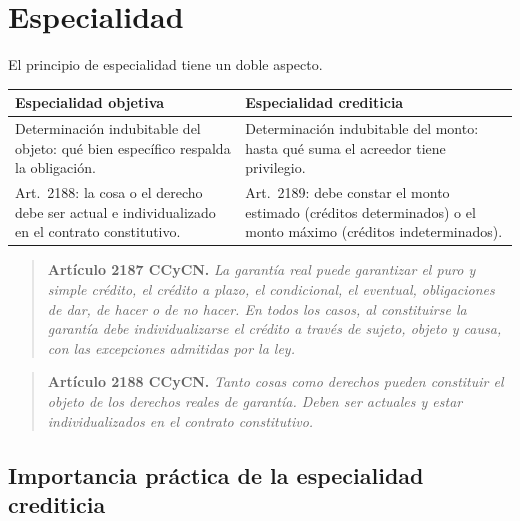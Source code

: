 \documentclass[12pt,oneside]{book}
\begin{document}
\section{Especialidad}

El principio de especialidad tiene un doble aspecto.

\begin{table}[H]
\centering
\begin{tabularx}{\textwidth}{@{}LL@{}}
\toprule
\textbf{Especialidad objetiva} & \textbf{Especialidad crediticia} \\
\midrule
Determinación indubitable del objeto: qué bien específico respalda la obligación. & Determinación indubitable del monto: hasta qué suma el acreedor tiene privilegio. \\
\addlinespace
Art.~2188: la cosa o el derecho debe ser actual e individualizado en el contrato constitutivo. & Art.~2189: debe constar el monto estimado (créditos determinados) o el monto máximo (créditos indeterminados). \\
\bottomrule
\end{tabularx}
\end{table}

\begin{quote}
\textbf{Artículo 2187 CCyCN.} \textit{La garantía real puede garantizar el puro y simple crédito, el crédito a plazo, el condicional, el eventual, obligaciones de dar, de hacer o de no hacer. En todos los casos, al constituirse la garantía debe individualizarse el crédito a través de sujeto, objeto y causa, con las excepciones admitidas por la ley.}
\end{quote}

\begin{quote}
\textbf{Artículo 2188 CCyCN.} \textit{Tanto cosas como derechos pueden constituir el objeto de los derechos reales de garantía. Deben ser actuales y estar individualizados en el contrato constitutivo.}
\end{quote}

\subsection{Importancia práctica de la especialidad crediticia}
\end{document}
